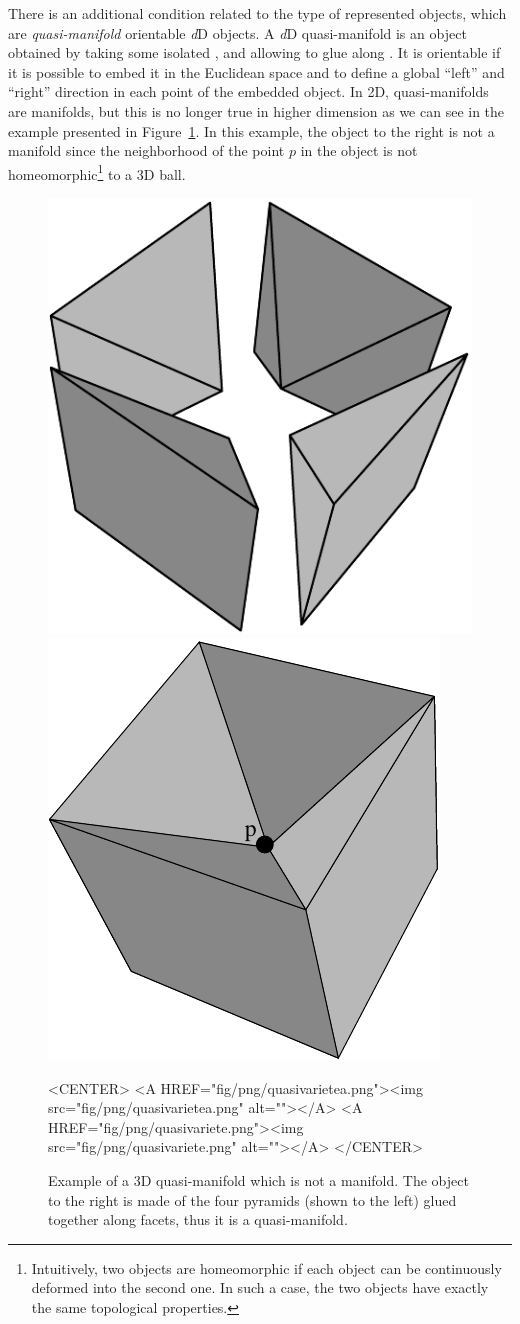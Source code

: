 There is an additional condition related to the type of represented
objects, which are \emph{quasi-manifold} orientable \emph{d}D objects.  A
\emph{d}D quasi-manifold is an object obtained by taking some isolated
, and allowing to glue  along . It is
orientable if it is possible to embed it in the Euclidean space and to
define a global ``left'' and ``right'' direction in each point of the
embedded object.  In 2D, quasi-manifolds are manifolds, but this is no
longer true in higher dimension as we can see in the example presented
in Figure~\ref{fig-quasivariete}.  In this example, the object to the
right is not a manifold since the neighborhood of the point $p$ in the
object is not homeomorphic\footnote{Intuitively, two objects are
  homeomorphic if each object can be continuously deformed into the
  second one.  In such a case, the two objects have exactly the same
  topological properties.}  to a 3D ball.
%
\begin{figure}
  \begin{ccTexOnly}
    \begin{center}
    \includegraphics[width=.33\textwidth]{Combinatorial_map/fig/pdf/quasivarietea}
    \includegraphics[width=.33\textwidth]{Combinatorial_map/fig/pdf/quasivariete}
    \end{center}
  \end{ccTexOnly}
  \begin{ccHtmlOnly}
    <CENTER>
    <A HREF="fig/png/quasivarietea.png"><img src="fig/png/quasivarietea.png" alt=""></A>
    <A HREF="fig/png/quasivariete.png"><img src="fig/png/quasivariete.png" alt=""></A>
    </CENTER>
  \end{ccHtmlOnly} 
  \caption{Example of a 3D quasi-manifold which is not a manifold.
    The object to the right is made of the four pyramids (shown to the
    left) glued together along facets, thus it is a quasi-manifold.}
  \label{fig-quasivariete}
\end{figure}


